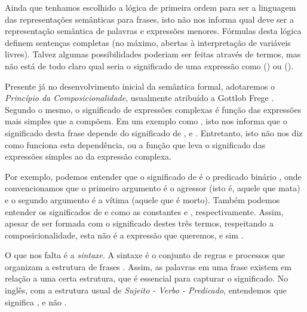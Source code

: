 Ainda que tenhamos escolhido a lógica de primeira ordem para ser a linguagem das representações semânticas para frases, isto não nos informa qual deve ser a representação semântica de palavras e expressões menores. Fórmulas desta lógica definem sentenças completas (no máximo, abertas à interpretação de variáveis livres). Talvez algumas possibilidades poderiam ser feitas através de termos, mas não está de todo claro qual seria o significado de uma expressão como  () ou  ().


Presente já no desenvolvimento inicial da semântica formal, adotaremos o \textit{Princípio da Composicionalidade}, usualmente atribuído a Gottlob Frege \cite[p.~94]{BlackburnBos:2005}.
%
%
Segundo o mesmo, o significado de expressões complexas é função das expressões mais simples que a compõem. Em um exemplo como , isto nos informa que o significado desta frase depende do significado de ,  e . Entretanto, isto não nos diz como funciona esta dependência, ou a função que leva o significado das expressões simples ao da expressão complexa.

Por exemplo, podemos entender que o significado de  é o predicado binário , onde convencionamos que o primeiro argumento é o agressor (isto é, aquele que mata) e o segundo argumento é a vítima (aquele que é morto). Também podemos entender os significados de  e  como as constantes  e , respectivamente. Assim, apesar de  ser formada com o significado destes três termos, respeitando a composicionalidade, esta não é a expressão que queremos, e sim .

O que nos falta é a \textit{sintaxe}. A sintaxe é o conjunto de regras e processos que organizam a estrutura de frases \citep[p.~2]{vanEijck:2010}. Assim, as palavras em uma frase existem em relação a uma certa estrutura, que é essencial para capturar o significado. No inglês, com a estrutura usual de \textit{Sujeito - Verbo - Predicado}, entendemos que  significa , e não .

